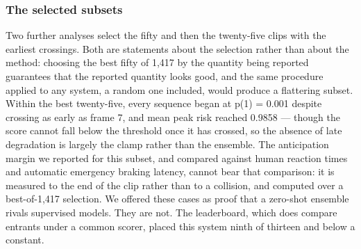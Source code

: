 \subsubsection{The selected subsets}
Two further analyses select the fifty and then the twenty-five clips with the earliest crossings. Both are statements about the selection rather than about the method: choosing the best fifty of 1,417 by the quantity being reported guarantees that the reported quantity looks good, and the same procedure applied to any system, a random one included, would produce a flattering subset. Within the best twenty-five, every sequence began at p(1) = 0.001 despite crossing as early as frame 7, and mean peak risk reached 0.9858 --- though the score cannot fall below the threshold once it has crossed, so the absence of late degradation is largely the clamp rather than the ensemble. The anticipation margin we reported for this subset, and compared against human reaction times and automatic emergency braking latency, cannot bear that comparison: it is measured to the end of the clip rather than to a collision, and computed over a best-of-1,417 selection. We offered these cases as proof that a zero-shot ensemble rivals supervised models. They are not. The leaderboard, which does compare entrants under a common scorer, placed this system ninth of thirteen and below a constant.

